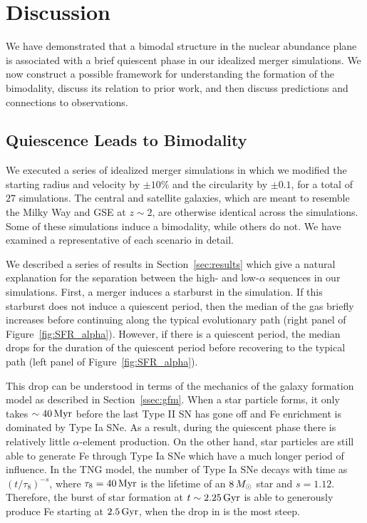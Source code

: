 \section{Discussion}\label{sec:discussion}
We have demonstrated that a bimodal structure in the nuclear abundance plane is associated with a brief quiescent phase in our idealized merger simulations. We now construct a possible framework for understanding the formation of the bimodality, discuss its relation to prior work, and then discuss predictions and connections to observations.

\subsection{Quiescence Leads to Bimodality}\label{ssec:formqui}
We executed a series of idealized merger simulations in which we modified the starting radius and velocity by $\pm10\%$ and the circularity by $\pm0.1$, for a total of $27$ simulations. The central and satellite galaxies, which are meant to resemble the Milky Way and GSE at $z\sim2$, are otherwise identical across the simulations. Some of these simulations induce a bimodality, while others do not. We have examined a representative of each scenario in detail.

We described a series of results in Section~\ref{sec:results} which give a natural explanation for the separation between the high- and low-$\alpha$ sequences in our simulations. First, a merger induces a starburst in the simulation. If this starburst does not induce a quiescent period, then the median \MgFe{} of the gas briefly increases before continuing along the typical evolutionary path (right panel of Figure~\ref{fig:SFR_alpha}). However, if there is a quiescent period, the median \MgFe{} drops for the duration of the quiescent period before recovering to the typical path (left panel of Figure~\ref{fig:SFR_alpha}).

This drop can be understood in terms of the mechanics of the galaxy formation model as described in Section~\ref{ssec:gfm}. When a star particle forms, it only takes $\sim40\,\textrm{Myr}$ before the last Type II SN has gone off and Fe enrichment is dominated by Type Ia SNe. As a result, during the quiescent phase there is relatively little $\alpha$-element production. On the other hand, star particles are still able to generate Fe through Type Ia SNe which have a much longer period of influence. In the TNG model, the number of Type Ia SNe decays with time as $(t/\tau_8)^{-s}$, where $\tau_8=40\,\textrm{Myr}$ is the lifetime of an $8\,M_{\odot}$ star and $s=1.12$. Therefore, the burst of star formation at $t\sim2.25\,\textrm{Gyr}$ is able to generously produce Fe starting at $2.5\,\textrm{Gyr}$, when the drop in \MgFe{} is the most steep.

